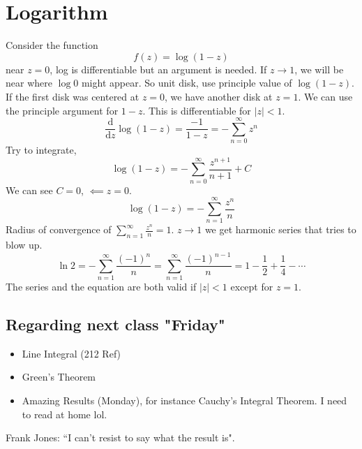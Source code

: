 \documentclass[letter]{article}
\begin{document}

\section{Logarithm}
	Consider the function \[
	f(z) = \log(1-z)
	\] near $z=0$, log is differentiable but an argument is needed. If $z\to 1$, we will be near where $\log 0$  might appear. So unit disk, use principle value of $\log (1-z)$. If the first disk was centered at $z=0$, we have another disk at $z=1$. We can use the principle argument for $1-z$. This is differentiable for $|z| <1$. 
	\[
		\frac{\mathrm{d} }{\mathrm{d} z} \log(1-z) =\frac{-1}{1-z} = - \sum_{n=0}^{\infty} z^{n}
	\]
	Try to integrate, 
	\[
	\log(1-z)=-\sum_{n=0}^{\infty} \frac{z^{n+1}}{n+1} + C
	\] 
	We can see $C = 0$, $\impliedby z=0$. 
	\[
	\log(1-z)=-\sum_{n=1}^{\infty} \frac{z^{n}}{n}
	\]
	Radius of convergence of $\sum_{n=1}^{\infty} \frac{z^{n}}{n} = 1$. $z\to 1$ we get harmonic series that tries to blow up.
	\[
	\ln 2 = - \sum_{n=1}^{\infty} \frac{(-1)^{n}}{n} = \sum_{n=1}^{\infty} \frac{(-1)^{n-1}}{n}=1-\frac{1}{2}+\frac{1}{4}-\cdots
	\] The series and the equation are both valid if $|z|<1$ except for $z = 1$.

	\subsection{Regarding next class "Friday"}
	\begin{itemize}
		\item Line Integral (212 Ref)
		\item Green's Theorem 
		\item Amazing Results (Monday), for instance Cauchy's Integral Theorem. I need to read at home lol. 
	\end{itemize} Frank Jones: ``I can't resist to say what the result is". 
\end{document}
